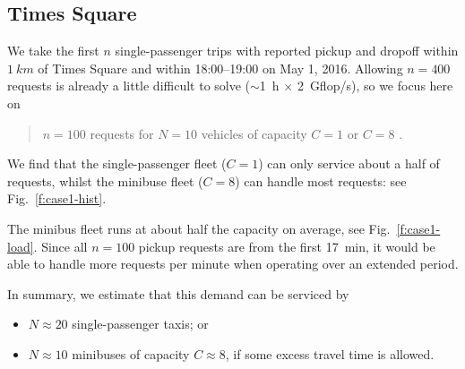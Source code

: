 \documentclass[12pt,notitlepage]{article}
\begin{document}
\subsection{Times Square} \label{s:case1}

We take%
the first $n$ single-passenger trips 
with
reported pickup and dropoff 
within
$\SI{1}{km}$ of Times Square
and
within 
18:00--19:00 on May 1, 2016.
%
%
Allowing $n = 400$ requests
is already a little difficult to solve ($\sim$\SI{1}{h} $\times$ \SI{2}{Gflop/s}),
so we focus here on
\begin{quote}
	$n = 100$ requests
	for
	$N = 10$ vehicles of capacity $C = 1$ or $C = 8$
	.
\end{quote}

%

We find that the single-passenger fleet ($C = 1$)
can only service about a half of requests,
whilst
the minibuse fleet ($C = 8$) can handle most requests:
see Fig.~\ref{f:case1-hist}.

%

The minibus fleet runs at about half the capacity on average, see Fig.~\ref{f:case1-load}.
%
Since all $n = 100$ pickup requests are from the first \SI{17}{min},
it would be able to handle more requests per minute
when operating over an extended period.

%

In summary,
we estimate that this demand can be serviced by 
\begin{itemize}
\item 
	$N \approx 20$ single-passenger taxis; or
\item
	$N \approx 10$ minibuses of capacity $C \approx 8$,
	if some excess travel time is allowed.
\end{itemize}

%



\end{document}
